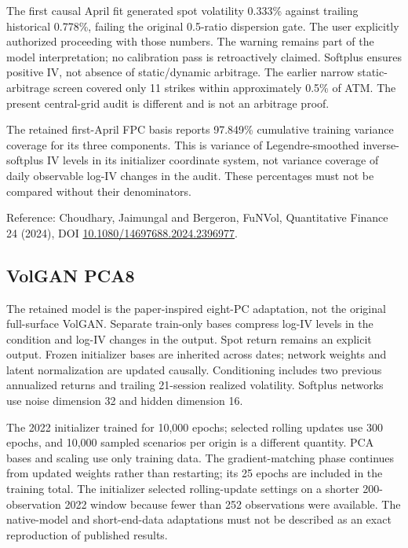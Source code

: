 \documentclass[11pt]{article}
\begin{document}
The first causal April fit generated spot volatility 0.333\% against trailing historical 0.778\%, failing the original 0.5-ratio dispersion gate. The user explicitly authorized proceeding with those numbers. The warning remains part of the model interpretation; no calibration pass is retroactively claimed. Softplus ensures positive IV, not absence of static/dynamic arbitrage. The earlier narrow static-arbitrage screen covered only 11 strikes within approximately 0.5\% of ATM. The present central-grid audit is different and is not an arbitrage proof.

The retained first-April FPC basis reports 97.849\% cumulative training variance coverage for its three components. This is variance of Legendre-smoothed inverse-softplus IV levels in its initializer coordinate system, not variance coverage of daily observable log-IV changes in the audit. These percentages must not be compared without their denominators.

Reference: Choudhary, Jaimungal and Bergeron, FuNVol, Quantitative Finance 24 (2024), DOI \href{https://doi.org/10.1080/14697688.2024.2396977}{10.1080/14697688.2024.2396977}.

\subsection{VolGAN PCA8}

The retained model is the paper-inspired eight-PC adaptation, not the original full-surface VolGAN. Separate train-only bases compress log-IV levels in the condition and log-IV changes in the output. Spot return remains an explicit output. Frozen initializer bases are inherited across dates; network weights and latent normalization are updated causally. Conditioning includes two previous annualized returns and trailing 21-session realized volatility. Softplus networks use noise dimension 32 and hidden dimension 16.

The 2022 initializer trained for 10,000 epochs; selected rolling updates use 300 epochs, and 10,000 sampled scenarios per origin is a different quantity. PCA bases and scaling use only training data. The gradient-matching phase continues from updated weights rather than restarting; its 25 epochs are included in the training total. The initializer selected rolling-update settings on a shorter 200-observation 2022 window because fewer than 252 observations were available. The native-model and short-end-data adaptations must not be described as an exact reproduction of published results.
\end{document}
